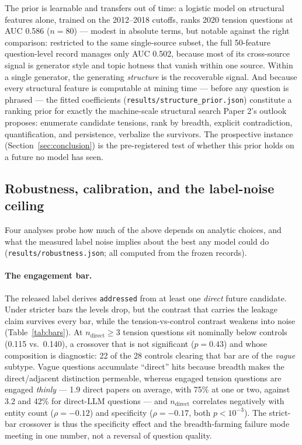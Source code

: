 \documentclass[11pt]{article}
\begin{document}
The prior is learnable and transfers out of time: a logistic model on
structural features alone, trained on the 2012--2018 cutoffs, ranks
2020 tension questions at AUC 0.586 ($n=80$) --- modest in absolute
terms, but notable against the right comparison: restricted to the same
single-source subset, the full 50-feature question-level record manages
only AUC 0.502, because most of its cross-source signal is generator
style and topic hotness that vanish within one source. Within a single
generator, the generating \emph{structure} is the recoverable signal.
And because every structural feature is computable at mining time ---
before any question is phrased --- the fitted coefficients
(\texttt{results/structure\_prior.json}) constitute a ranking prior for
exactly the machine-scale structural search Paper 2's outlook proposes:
enumerate candidate tensions, rank by breadth, explicit contradiction,
quantification, and persistence, verbalize the survivors. The
prospective instance (Section~\ref{sec:conclusion}) is the pre-registered test of whether
this prior holds on a future no model has seen.

\subsection{Robustness, calibration, and the label-noise ceiling}
\label{sec:robustness}

Four analyses probe how much of the above depends on analytic choices, and
what the measured label noise implies about the best any model could do
(\texttt{results/robustness.json}; all computed from the frozen records).

\paragraph{The engagement bar.} The released label derives
\texttt{addressed} from at least one \emph{direct} future candidate. Under
stricter bars the levels drop, but the contrast that carries the leakage
claim survives every bar, while the tension-vs-control contrast weakens
into noise (Table~\ref{tab:bars}). At $n_\mathrm{direct}\geq 3$ tension
questions sit nominally below controls (0.115 vs.\ 0.140), a crossover
that is not significant ($p=0.43$) and whose composition is diagnostic:
22 of the 28 controls clearing that bar are of the \emph{vague} subtype.
Vague questions accumulate ``direct'' hits because breadth makes the
direct/adjacent distinction permeable, whereas engaged tension questions
are engaged \emph{thinly} --- 1.9 direct papers on average, with 75\% at
one or two, against 3.2 and 42\% for direct-LLM questions --- and
$n_\mathrm{direct}$ correlates negatively with entity count
($\rho=-0.12$) and specificity ($\rho=-0.17$, both $p<10^{-3}$). The
strict-bar crossover is thus the specificity effect and the
breadth-farming failure mode meeting in one number, not a reversal of
question quality.
\end{document}
